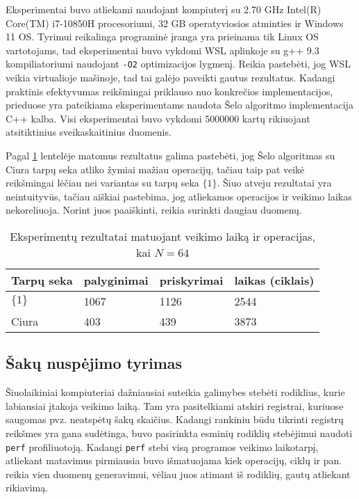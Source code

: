 \documentclass{VUMIFInfBakalaurinis}
\begin{document}
Eksperimentai buvo atliekami naudojant kompiuterį su 2.70 GHz Intel(R) Core(TM) i7-10850H procesoriumi, 32 GB operatyviosios atminties ir Windows 11 OS.
Tyrimui reikalinga programinė įranga yra prieinama tik Linux OS vartotojams, tad eksperimentai buvo vykdomi WSL aplinkoje su g++ 9.3 kompiliatoriumi naudojant \verb|-O2| optimizacijos lygmenį.
Reikia pastebėti, jog WSL veikia virtualioje mašinoje, tad tai galėjo paveikti gautus rezultatus.
Kadangi praktinis efektyvumas reikšmingai priklauso nuo konkrečios implementacijos, prieduose yra pateikiama eksperimentams naudota Šelo algoritmo implementacija C++ kalba.
Visi eksperimentai buvo vykdomi 5000000 kartų rikiuojant atsitiktinius sveikaskaitinius duomenis.

Pagal \ref{experiment_results_64} lentelėje matomus rezultatus galima pastebėti, jog
Šelo algoritmas su Ciura tarpų seka atliko žymiai mažiau operacijų, tačiau taip pat veikė reikšmingai lėčiau nei variantas su tarpų seka  $\{1\}$.
Šiuo atveju rezultatai yra neintuityvūs, tačiau aiškiai pastebima, jog atliekamos operacijos ir veikimo laikas nekoreliuoja.
Norint juos paaiškinti, reikia surinkti daugiau duomenų. 

\begin{table}[H]
  \caption{Eksperimentų rezultatai matuojant veikimo laiką ir operacijas, kai $N = 64$}
  \label{experiment_results_64}
  \centering
  \begin{tabular}{@{}llll@{}}
  Tarpų seka            & palyginimai       & priskyrimai      & laikas (ciklais) \\ \midrule
  $\{1\}$               & 1067              & 1126             & 2544                  \\
  Ciura                 & 403               & 439              & 3873                  \\ \bottomrule
  \end{tabular}
\end{table}

\subsection{Šakų nuspėjimo tyrimas}

Šiuolaikiniai kompiuteriai dažniausiai suteikia galimybes stebėti rodiklius, kurie labiausiai įtakoja veikimo laiką.
Tam yra pasitelkiami atskiri registrai, kuriuose saugomas pvz. neatspėtų šakų skaičius.
Kadangi rankiniu būdu tikrinti registrų reikšmes yra gana sudėtinga, buvo pasirinkta esminių rodiklių stebėjimui naudoti \verb|perf| profiliuotoją.
Kadangi \verb|perf| stebi visą programos veikimo laikotarpį, atliekant matavimus pirmiausia buvo išmatuojama kiek operacijų, ciklų ir pan. reikia vien duomenų generavimui,
vėliau juos atimant iš rodiklių, gautų atliekant rikiavimą.
\end{document}
